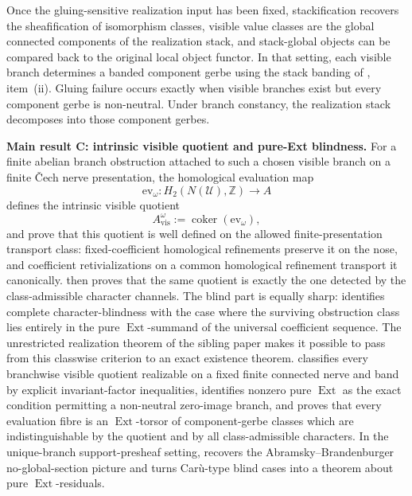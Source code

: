 Once the gluing-sensitive realization input has been fixed, stackification recovers the sheafification of isomorphism classes, visible value classes are the global connected components of the realization stack, and stack-global objects can be compared back to the original local object functor. In that setting, each visible branch determines a banded component gerbe using the stack banding of , item~\textup{(ii)}. Gluing failure occurs exactly when visible branches exist but every component gerbe is non-neutral. Under branch constancy, the realization stack decomposes into those component gerbes.

\medskip
\noindent\textbf{Main result C: intrinsic visible quotient and pure-Ext blindness.}
For a finite abelian branch obstruction attached to such a chosen visible branch on a finite \v{C}ech nerve presentation, the homological evaluation map
\[
\mathrm{ev}_{\omega}:H_2(N(\mathcal U),\mathbb Z)\to A
\]
defines the intrinsic visible quotient
\[
A_{\mathrm{vis}}^{\omega}:=\operatorname{coker}(\mathrm{ev}_{\omega}),
\]
and  prove that this quotient is well defined on the allowed finite-presentation transport class: fixed-coefficient homological refinements preserve it on the nose, and coefficient retivializations on a common homological refinement transport it canonically.  then proves that the same quotient is exactly the one detected by the class-admissible character channels. The blind part is equally sharp:  identifies complete character-blindness with the case where the surviving obstruction class lies entirely in the pure $\operatorname{Ext}$-summand of the universal coefficient sequence. The unrestricted realization theorem of the sibling paper makes it possible to pass from this classwise criterion to an exact existence theorem.  classifies every branchwise visible quotient realizable on a fixed finite connected nerve and band by explicit invariant-factor inequalities, identifies nonzero pure $\operatorname{Ext}$ as the exact condition permitting a non-neutral zero-image branch, and proves that every evaluation fibre is an $\operatorname{Ext}$-torsor of component-gerbe classes which are indistinguishable by the quotient and by all class-admissible characters. In the unique-branch support-presheaf setting,  recovers the Abramsky--Brandenburger no-global-section picture and turns Car\`u-type blind cases into a theorem about pure $\operatorname{Ext}$-residuals.

